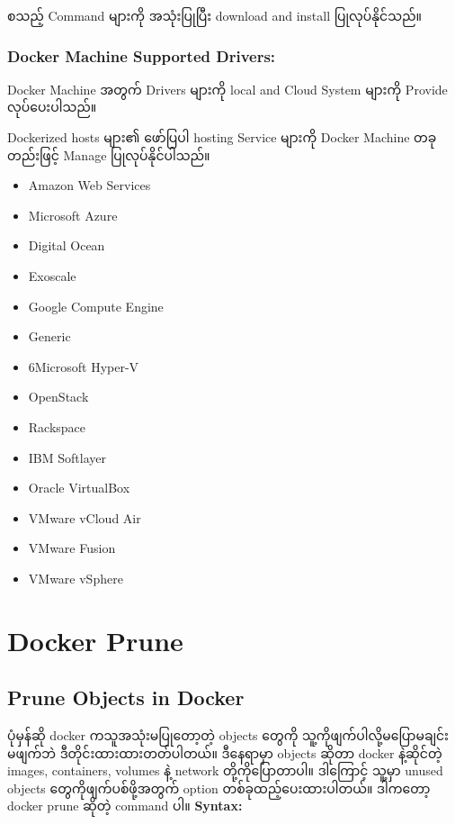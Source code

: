 \documentclass{article}
\begin{document}
စသည့် Command များကို အသုံးပြုပြီး download and install ပြုလုပ်နိုင်သည်။

\subsubsection{Docker Machine Supported
Drivers:}\label{docker-machine-supported-drivers}

Docker Machine အတွက် Drivers များကို local and Cloud System များကို
Provide လုပ်ပေးပါသည်။

Dockerized hosts များ၏ ဖော်ပြပါ hosting Service များကို Docker Machine
တခုတည်းဖြင့် Manage ပြုလုပ်နိုင်ပါသည်။

\begin{itemize}
\itemsep1pt\parskip0pt
\item
  Amazon Web Services
\item
  Microsoft Azure
\item
  Digital Ocean
\item
  Exoscale
\item
  Google Compute Engine
\item
  Generic
\item
  6Microsoft Hyper-V
\item
  OpenStack
\item
  Rackspace
\item
  IBM Softlayer
\item
  Oracle VirtualBox
\item
  VMware vCloud Air
\item
  VMware Fusion
\item
  VMware vSphere
\end{itemize}

\section{Docker Prune}\label{docker-prune}

\subsection{Prune Objects in Docker}\label{prune-objects-in-docker}

ပုံမှန်ဆို docker ကသူအသုံးမပြုတော့တဲ့ objects ‌တွေကို
သူ့ကိုဖျက်ပါလို့မပြောမချင်း မဖျက်ဘဲ ဒီတိုင်းထားထားတတ်ပါတယ်။ ဒီနေရာမှာ
objects ဆိုတာ docker နဲ့ဆိုင်တဲ့ images, containers, volumes နဲ့ network
တို့ကိုပြောတာပါ။ ဒါကြောင့် သူ့မှာ unused objects တွေကိုဖျက်ပစ်ဖို့အတွက်
option တစ်ခုထည့်ပေးထားပါတယ်။ ဒါကတော့ docker prune ဆိုတဲ့ command ပါ။
\textbf{Syntax:}
\end{document}
